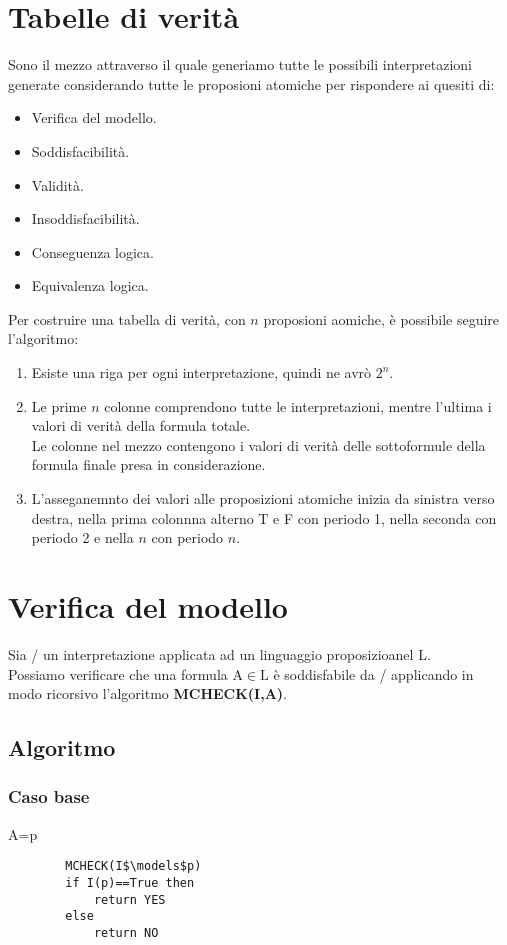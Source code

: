 \documentclass[../main.tex]{subfiles}
\begin{document}
    \section{Tabelle di verità}
    Sono il mezzo attraverso il quale generiamo tutte le possibili interpretazioni generate considerando tutte le proposioni atomiche per rispondere ai quesiti di:
    \begin{itemize}
        \item Verifica del modello.
        \item Soddisfacibilità.
        \item Validità.
        \item Insoddisfacibilità.
        \item Conseguenza logica.
        \item Equivalenza logica.
    \end{itemize}
    Per costruire una tabella di verità, con $n$ proposioni aomiche, è possibile seguire l'algoritmo:
    \begin{enumerate}
        \item Esiste una riga per ogni interpretazione, quindi ne avrò $2^n$.
        \item Le prime $n$ colonne comprendono tutte le interpretazioni, mentre l'ultima i valori di verità della formula totale.\\
            Le colonne nel mezzo contengono i valori di verità delle sottoformule della formula finale presa in considerazione.
        \item L'asseganemnto dei valori alle proposizioni atomiche inizia da sinistra verso destra, nella prima colonnna alterno T e F con periodo 1, nella seconda con periodo 2 e nella $n$ con periodo $n$.
    \end{enumerate}

    \section{Verifica del modello}
    Sia / un interpretazione applicata ad un linguaggio proposizioanel L.\\
    Possiamo verificare che una formula A$\in$L è soddisfabile da / applicando in modo ricorsivo l'algoritmo \textbf{MCHECK(I,A)}.

    \subsection{Algoritmo}
    \subsubsection{Caso base}
    A=p
    \begin{lstlisting}
        MCHECK(I$\models$p)
        if I(p)==True then
            return YES
        else
            return NO
    \end{lstlisting}
\end{document}
